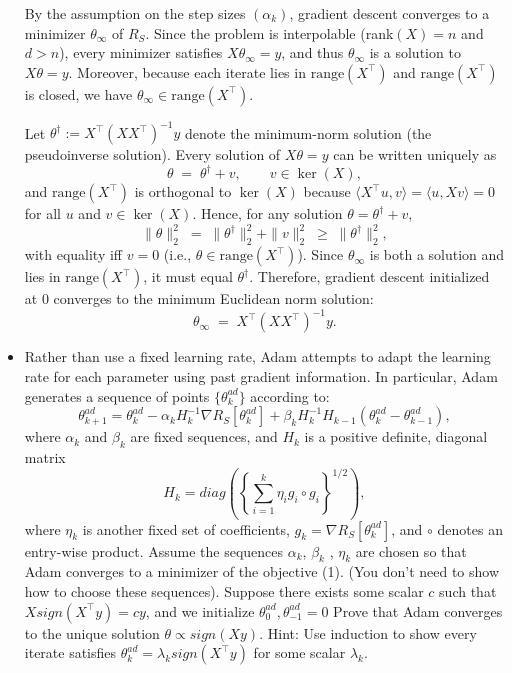 \documentclass[a4paper]{article}
\begin{document}
\begin{itemize}
By the assumption on the step sizes $(\alpha_k)$, gradient descent converges to a minimizer
$\theta_\infty$ of $R_S$. Since the problem is interpolable (rank$(X)=n$ and $d>n$),
every minimizer satisfies $X\theta_\infty = y$, and thus $\theta_\infty$ is a solution to $X\theta=y$.
Moreover, because each iterate lies in $\mathrm{range}(X^\top)$ and $\mathrm{range}(X^\top)$ is closed,
we have $\theta_\infty \in \mathrm{range}(X^\top)$.

Let $\theta^\dagger := X^\top (XX^\top)^{-1}y$ denote the minimum-norm solution (the pseudoinverse solution).
Every solution of $X\theta=y$ can be written uniquely as
\[
\theta \;=\; \theta^\dagger + v, \qquad v\in \ker(X),
\]
and $\mathrm{range}(X^\top)$ is orthogonal to $\ker(X)$ because
$\langle X^\top u, v\rangle = \langle u, Xv\rangle = 0$ for all $u$ and $v\in\ker(X)$.
Hence, for any solution $\theta=\theta^\dagger+v$,
\[
\|\theta\|_2^2 \;=\; \|\theta^\dagger\|_2^2 + \|v\|_2^2 \;\ge\; \|\theta^\dagger\|_2^2,
\]
with equality iff $v=0$ (i.e., $\theta\in \mathrm{range}(X^\top)$).
Since $\theta_\infty$ is both a solution and lies in $\mathrm{range}(X^\top)$, it must equal $\theta^\dagger$.
Therefore, gradient descent initialized at $0$ converges to the minimum Euclidean norm solution:
\[
\theta_\infty \;=\; X^\top(XX^\top)^{-1}y.
\]

    \item Rather than use a fixed learning rate, Adam attempts to adapt the learning rate for each parameter using past gradient information.
    In particular, Adam generates a sequence of points $\{\theta_k^{ad}\}$ according to:
    $$\theta_{k+1}^{ad} = \theta_k^{ad} - \alpha_k H_k^{-1} \nabla R_S [\theta_k^{ad}] + \beta_k H_k^{-1} H_{k-1} (\theta_k^{ad} - \theta_{k-1}^{ad}),$$
where $\alpha_k$ and $\beta_k$ are fixed sequences, and $H_k$ is a positive definite, diagonal matrix
$$H_k = \mathit{diag}\left(\left\{\sum_{i=1}^k \eta_i g_i \circ g_i\right\}^{1/2}\right),$$
where $\eta_k$ is another fixed set of coefficients, $g_k = \nabla R_S [\theta_k^{ad}]$, and $\circ$ denotes an entry-wise product.
Assume the sequences $\alpha_k$, $\beta_k$ , $\eta_k$ are chosen so that Adam converges to a minimizer of the objective (1).  (You don’t need to show how to choose these sequences).
Suppose there exists some scalar $c$ such that $X\mathit{sign}(X^\top y) = cy$, and we initialize $\theta_0^{ad} , \theta_{-1}^{ad} = 0$
Prove that Adam converges to the unique solution $\theta \propto \mathit{sign}(X y)$.
Hint: Use induction to show every iterate satisfies $\theta_k^{ad} = \lambda_k \mathit{sign}(X^\top y)$ for some scalar $\lambda_k$.


\end{itemize}
\end{document}
